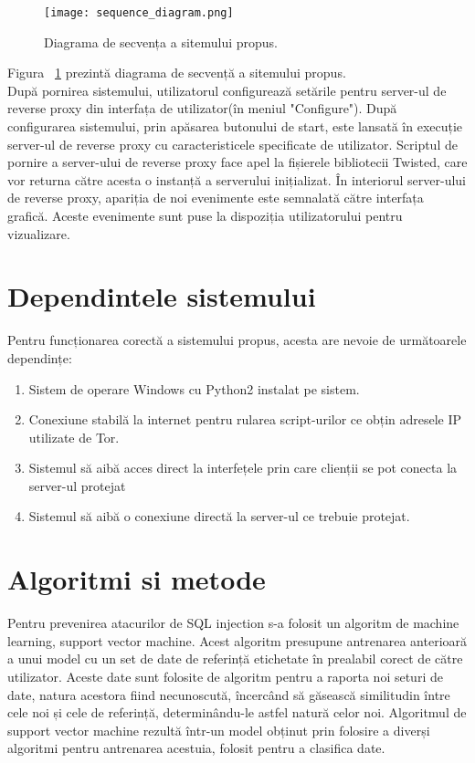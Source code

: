 \begin{figure}[h]
	\centering
	\texttt{[image: sequence\_diagram.png]}
	\caption{ Diagrama de secvența a sitemului propus. }
	\label{fig:sequence}
\end{figure}
Figura ~\ref{fig:sequence}  prezintă diagrama de secvență a sitemului propus.  \\

După pornirea sistemului, utilizatorul configurează setările pentru server-ul de reverse proxy din interfața de utilizator(în meniul "Configure"). După configurarea sistemului, prin apăsarea butonului de start, este lansată în execuție server-ul de reverse proxy cu caracteristicele specificate de utilizator. Scriptul de pornire a server-ului de reverse proxy face apel la fișierele bibliotecii Twisted, care vor returna către acesta o instanță a serverului inițializat. În interiorul server-ului de reverse proxy, apariția de noi evenimente este semnalată către interfața grafică. Aceste evenimente sunt puse la dispoziția utilizatorului pentru vizualizare. 
\\
\section{Dependintele sistemului}

Pentru funcționarea corectă a sistemului propus, acesta are nevoie de următoarele dependințe: 
\begin{enumerate}
	\item Sistem de operare Windows cu Python2 instalat pe sistem. 
	\item Conexiune stabilă la internet pentru rularea script-urilor ce obțin adresele IP utilizate de Tor. 
	\item Sistemul să aibă acces direct la interfețele prin care clienții se pot conecta la server-ul protejat 
	\item Sistemul să aibă o conexiune directă la server-ul ce trebuie protejat. 
\end{enumerate}
\section{Algoritmi si metode}

Pentru prevenirea atacurilor de SQL injection s-a folosit un algoritm de machine learning, support vector machine. Acest algoritm presupune antrenarea anterioară a unui model cu un set de date de referință etichetate în prealabil corect de către utilizator. Aceste date sunt folosite de algoritm pentru a raporta noi seturi de date, natura acestora fiind necunoscută, încercând să găsească similitudin între cele noi și cele de referință, determinându-le astfel natură celor noi. Algoritmul de support vector machine rezultă într-un model obținut prin folosire a diverși algoritmi pentru antrenarea acestuia, folosit pentru a clasifica date. 


